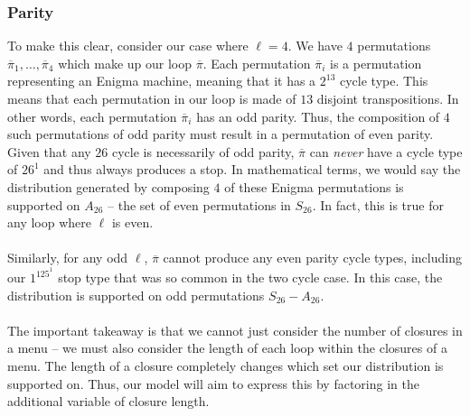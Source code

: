 \subsubsection{Parity}
To make this clear, consider our case where $\ell=4$. We have $4$
permutations $\overline\pi_1,\dots, \overline\pi_4$ which make up our
loop $\overline\pi$. Each permutation $\overline\pi_i$ is a
permutation representing an Enigma machine, meaning that it has a
$2^{13}$ cycle type. This means that each permutation in our loop is made
of $13$ disjoint transpositions. In other words, each permutation
$\overline\pi_i$ has an odd parity. Thus, the composition of $4$ such
permutations of odd parity must result in a permutation of even
parity. Given that any $26$ cycle is necessarily of odd parity,
$\overline\pi$ can \emph{never} have a cycle type of $26^1$ and thus
always produces a stop. In mathematical terms, we would say the
distribution generated by composing $4$ of these Enigma permutations
is supported on $A_{26}$ -- the set of even permutations in $S_{26}$.
In fact, this is true for any loop where $\ell$ is even.
\\\\Similarly, for any odd $\ell$, $\overline\pi$ cannot produce any
even parity cycle types, including our $1^125^1$ stop type that was
so common in the two cycle case. In this case, the distribution is
supported on odd permutations $S_{26}-A_{26}$.
\\\\The important takeaway is that we cannot just consider the number
of closures in a menu -- we must also consider the length of each
loop within the closures of a menu. The length of a closure
completely changes which set our distribution is supported on. Thus,
our model will aim to express this by factoring in the additional
variable of closure length.
